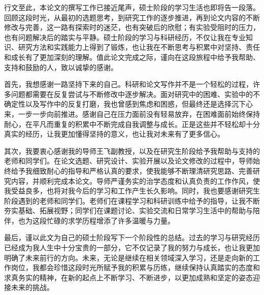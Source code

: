 



行文至此，本论文的撰写工作已接近尾声，硕士阶段的学习生活也即将告一段落。回顾这段时光，从最初的选题思考，到研究工作的逐步推进，再到论文内容的不断修改与完善，这一路有探索时的迷茫，也有突破后的欣慰；有实验受阻时的压力，也有问题解决后的踏实与平静。硕士阶段的学习与科研经历，不仅让我在专业知识、研究方法和实践能力上得到了锻炼，也让我在不断思考与积累中对坚持、责任和成长有了更加深刻的理解。值此论文完成之际，谨向在这段旅程中给予我帮助、支持和鼓励的人，致以诚挚的感谢。

首先，我想感谢一路坚持下来的自己。科研和论文写作并不是一个轻松的过程，许多问题都需要在反复尝试与不断修改中逐步解决。面对研究中的困难、实验中的不确定性以及写作中的反复打磨，我也曾感到焦虑和困惑，但最终还是选择沉下心来，一步一步向前推进。感谢自己在压力面前没有轻易放弃，在困难面前始终保持耐心，在平凡而重复的积累中不断完成自我调整与成长。正是这些并不轻松却十分真实的经历，让我更加懂得坚持的意义，也让我对未来有了更多信心。

其次，我要衷心感谢我的导师王飞副教授，以及在研究生阶段给予我帮助与支持的老师和同学们。在论文选题、研究设计、实验开展以及论文修改的过程中，导师始终给予我细致耐心的指导和严格认真的要求，使我能够不断理清研究思路、完善研究内容，并顺利完成本论文。导师严谨务实的治学态度和认真负责的工作作风，使我受益良多，也将对我今后的学习和工作产生长久影响。同时，我也要感谢研究生阶段遇到的老师和同学们。老师们在课程学习和科研训练中给予的指导，让我不断夯实基础、拓展视野；同学们在课题讨论、实验交流和日常学习生活中的帮助与陪伴，也为这段忙碌的求学历程增添了许多温暖与力量。

最后，谨以此文为自己的硕士阶段写下一个阶段性的总结。过去的学习与研究经历已经成为我人生中十分宝贵的一部分，它不仅记录了我的努力与成长，也让我更加明确了未来前行的方向。未来，无论是继续在相关领域深入学习，还是走向新的工作岗位，我都会珍惜这段时光所赋予我的积累与历练，继续保持认真踏实的态度和求真务实的精神，在新的起点上不断学习、不断进步，以更加成熟和坚定的姿态迎接未来的挑战。